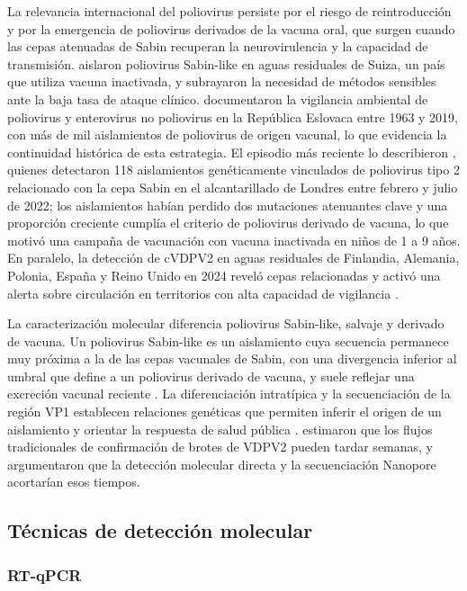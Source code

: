 La relevancia internacional del poliovirus persiste por el riesgo de reintroducción y por la emergencia de poliovirus derivados de la vacuna oral, que surgen cuando las cepas atenuadas de Sabin recuperan la neurovirulencia y la capacidad de transmisión.  aislaron poliovirus Sabin-like en aguas residuales de Suiza, un país que utiliza vacuna inactivada, y subrayaron la necesidad de métodos sensibles ante la baja tasa de ataque clínico.  documentaron la vigilancia ambiental de poliovirus y enterovirus no poliovirus en la República Eslovaca entre 1963 y 2019, con más de mil aislamientos de poliovirus de origen vacunal, lo que evidencia la continuidad histórica de esta estrategia. El episodio más reciente lo describieron , quienes detectaron 118 aislamientos genéticamente vinculados de poliovirus tipo 2 relacionado con la cepa Sabin en el alcantarillado de Londres entre febrero y julio de 2022; los aislamientos habían perdido dos mutaciones atenuantes clave y una proporción creciente cumplía el criterio de poliovirus derivado de vacuna, lo que motivó una campaña de vacunación con vacuna inactivada en niños de 1 a 9 años. En paralelo, la detección de cVDPV2 en aguas residuales de Finlandia, Alemania, Polonia, España y Reino Unido en 2024 reveló cepas relacionadas y activó una alerta sobre circulación en territorios con alta capacidad de vigilancia \cite{Bottcher_2025}.

La caracterización molecular diferencia poliovirus Sabin-like, salvaje y derivado de vacuna. Un poliovirus Sabin-like es un aislamiento cuya secuencia permanece muy próxima a la de las cepas vacunales de Sabin, con una divergencia inferior al umbral que define a un poliovirus derivado de vacuna, y suele reflejar una excreción vacunal reciente \cite{Klapsa_2022,Asghar_2014}. La diferenciación intratípica y la secuenciación de la región VP1 establecen relaciones genéticas que permiten inferir el origen de un aislamiento y orientar la respuesta de salud pública \cite{Asghar_2014,Klapsa_2022}.  estimaron que los flujos tradicionales de confirmación de brotes de VDPV2 pueden tardar semanas, y argumentaron que la detección molecular directa y la secuenciación Nanopore acortarían esos tiempos.

\subsection{Técnicas de detección molecular}

\subsubsection{RT-qPCR}

